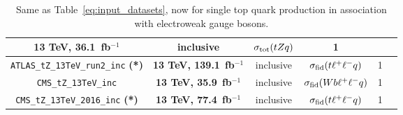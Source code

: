 \begin{table}[t]
\begin{tabular}{c|c|c|c|c|c}
 \multirow{1}{*}{{\bf 13 TeV, 36.1}~{\rm \bf fb}$^{-1}$}    & \multirow{1}{*}{inclusive}   &
\multirow{1}{*}{$\sigma_{\rm tot}(tZq)$}  &  1  &
\multirow{1}{*}{\cite{Aaboud:2017ylb}}  \\
\midrule
 \multirow{1}{*}{ {\tt ATLAS\_tZ\_13TeV\_run2\_inc} {\bf (*)}}      &
 \multirow{1}{*}{{\bf 13 TeV, 139.1}~{\rm \bf fb}$^{-1}$}    & \multirow{1}{*}{inclusive}   &
\multirow{1}{*}{$\sigma_{\rm fid}(t\ell^+\ell^-q)$}  &  1  &
\multirow{1}{*}{\cite{Aad:2020wog}}  \\
\midrule
       \multirow{1}{*}{ {\tt CMS\_tZ\_13TeV\_inc}}      &
 \multirow{1}{*}{{\bf 13 TeV, 35.9}~{\rm \bf fb}$^{-1}$}   & \multirow{1}{*}{inclusive}   &
\multirow{1}{*}{$\sigma_{\rm fid}(Wb\ell^+\ell^-q)$}  &  1  &
\multirow{1}{*}{\cite{Sirunyan:2017nbr}}  \\
\midrule
       \multirow{1}{*}{ {\tt CMS\_tZ\_13TeV\_2016\_inc}  {\bf (*)}}      &
 \multirow{1}{*}{{\bf 13 TeV, 77.4}~{\rm \bf fb}$^{-1}$ }   & \multirow{1}{*}{inclusive}   &
\multirow{1}{*}{$\sigma_{\rm fid}(t\ell^+\ell^-q)$}  &  1  &
\multirow{1}{*}{\cite{Sirunyan:2018zgs}}  \\
\bottomrule
  \end{tabular}
  \caption{\small Same as Table~\ref{eq:input_datasets},
    now for single top quark production in association with
    electroweak gauge bosons.
     \label{eq:input_datasets4}
  }
\end{table}
